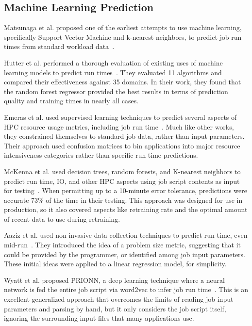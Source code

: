 \documentclass[conference, 10pt, onecolumn, draftclsnofoot]{IEEEtran}
\begin{document}
\subsection{Machine Learning Prediction}

Matsunaga et al. proposed one of the earliest attempts to use machine learning, specifically Support Vector Machine and k-nearest neighbors, to predict job run times from standard workload data~\cite{5493447}.

Hutter et al. performed a thorough evaluation of existing uses of machine learning models to predict run times~\cite{survey}.
They evaluated 11 algorithms and compared their effectiveness against 35 domains.
In their work, they found that the random forest regressor provided the best results in terms of prediction quality and training times in nearly all cases.

Emeras et al. used supervised learning techniques to predict several aspects of HPC resource usage metrics, including job run time~\cite{Evalix}.
Much like other works, they constrained themselves to standard job data, rather than input parameters.
Their approach used confusion matrices to bin applications into major resource intensiveness categories rather than specific run time predictions.

McKenna et al. used decision trees, random forests, and K-nearest neighbors to predict run time, IO, and other HPC aspects using job script contents as input for testing~\cite{7776517}.
When permitting up to a 10-minute error tolerance, predictions were accurate 73\% of the time in their testing.
This approach was designed for use in production, so it also covered aspects like retraining rate and the optimal amount of recent data to use during retraining.

Aaziz et al. used non-invasive data collection techniques to predict run time, even mid-run~\cite{Omar}.
They introduced the idea of a problem size metric, suggesting that it could be provided by the programmer, or identified among job input parameters.
These initial ideas were applied to a linear regression model, for simplicity.

Wyatt et al. proposed PRIONN, a deep learning technique where a neural network is fed the entire job script via word2vec to infer job run time~\cite{PRIONN}.
This is an excellent generalized approach that overcomes the limits of reading job input parameters and parsing by hand, but it only considers the job script itself, ignoring the surrounding input files that many applications use.
\end{document}
